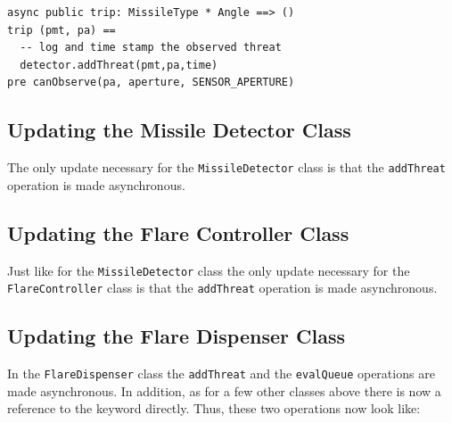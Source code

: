\documentclass{overturerepchap}
\begin{document}
\begin{lstlisting}
async public trip: MissileType * Angle ==> ()
trip (pmt, pa) ==
  -- log and time stamp the observed threat
  detector.addThreat(pmt,pa,time)
pre canObserve(pa, aperture, SENSOR_APERTURE)
\end{lstlisting}

\subsection{Updating the Missile Detector Class}

The only update necessary for the \texttt{MissileDetector} class is that
the \texttt{addThreat} operation is made asynchronous.

\subsection{Updating the Flare Controller Class}

Just like for the \texttt{MissileDetector} class the only update
necessary for the \texttt{FlareController} class is that the
\texttt{addThreat} operation is made asynchronous.

\subsection{Updating the Flare Dispenser Class}

In the \texttt{FlareDispenser} class the \texttt{addThreat} and the 
\texttt{evalQueue} operations are made asynchronous. In addition, as
for a few other classes above there is now a reference to the 
{\bf{}} keyword directly. Thus, these two operations now look
like:
\end{document}
